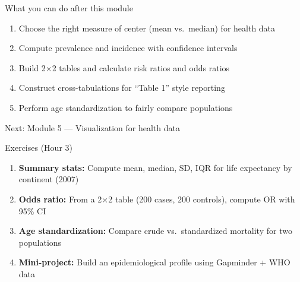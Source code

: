 \documentclass[aspectratio=169,11pt]{beamer}
\begin{document}
\begin{frame}{What you can do after this module}
\begin{enumerate}
  \item Choose the right measure of center (mean vs.\ median) for health data
  \item Compute prevalence and incidence with confidence intervals
  \item Build 2$\times$2 tables and calculate risk ratios and odds ratios
  \item Construct cross-tabulations for ``Table 1'' style reporting
  \item Perform age standardization to fairly compare populations
\end{enumerate}

\vspace{12pt}
\centering
\Large \alert{Next: Module 5 --- Visualization for health data}
\end{frame}

\begin{frame}{Exercises (Hour 3)}
\begin{enumerate}
  \item \textbf{Summary stats:} Compute mean, median, SD, IQR for life expectancy by continent (2007)
  \item \textbf{Odds ratio:} From a 2$\times$2 table (200 cases, 200 controls), compute OR with 95\% CI
  \item \textbf{Age standardization:} Compare crude vs.\ standardized mortality for two populations
  \item \textbf{Mini-project:} Build an epidemiological profile using Gapminder + WHO data
\end{enumerate}
\end{frame}
\end{document}

